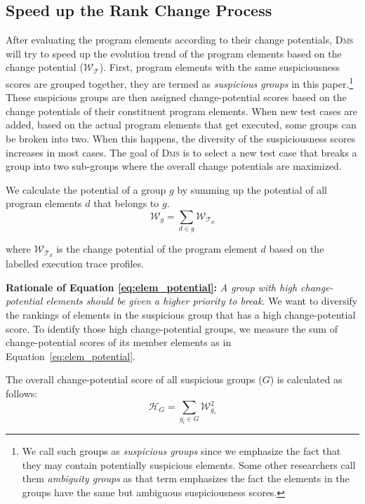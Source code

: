 \subsection{Speed up the Rank Change Process}

After evaluating the program elements according to their change potentials, \textsc{Dms} will try to speed up the evolution trend of the program elements based on the change potential ($\mathcal{W}_{\mathcal{T}}$). First, program elements with the same suspiciousness scores are grouped together, they are termed as {\em suspicious groups} in this paper.\footnote{We call such groups as {\em suspicious groups} since we emphasize the fact that they may contain potentially suspicious elements. Some other researchers \cite[e.g.][]{Alberto2011} call them {\em ambiguity groups} as that term emphasizes the fact the elements in the groups have the same but ambiguous suspiciousness scores.} These suspicious groups are then assigned change-potential scores based on the change potentials of their constituent program elements. When new test cases are added, based on the actual program elements that get executed, some groups can be broken into two. When this happens, the diversity of the suspiciousness scores increases in most cases. The goal of \textsc{Dms} is to select a new test case that breaks a group into two sub-groups where the overall change potentials are maximized.

We calculate the potential of a group $g$ by summing up the potential of all program elements $d$ that
belongs to $g$.
\begin{equation}
\label{eq:elem_potential}
	\mathcal{W}_{g} = \sum\limits_{d \in g}\mathcal{W}_{\mathcal{T}_{d}}
\end{equation}

\noindent
where $\mathcal{W}_{\mathcal{T}_d}$ is the change potential of the program element $d$ based on the labelled execution trace profiles.

\noindent\textbf{Rationale of Equation \ref{eq:elem_potential}:} \textit{A group with high change-potential elements should be given a higher priority to break.}
We want to diversify the rankings of elements in the suspicious group that has a high change-potential score. 
To identify those high change-potential groups, we measure the sum of change-potential scores of its member elements as in Equation~\ref{eq:elem_potential}.

The overall change-potential score of all suspicious groups ($G$) is calculated as follows:
\begin{equation}
	\mathcal{H}_G = \sum\limits_{g_{i} \in G}{ \mathcal{W}_{g_i}^{2} }\label{eq:groupset_potential}
\end{equation}

